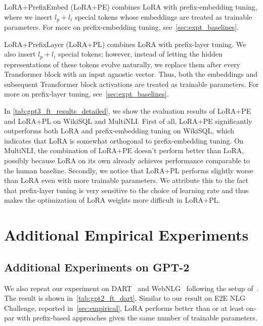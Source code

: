 \documentclass{article} %
\begin{document}
LoRA+PrefixEmbed (LoRA+PE) combines LoRA with prefix-embedding tuning, where we insert $l_p+l_i$ special tokens whose embeddings are treated as trainable parameters.
For more on prefix-embedding tuning, see~\autoref{sec:expt_baselines}.

LoRA+PrefixLayer (LoRA+PL) combines LoRA with prefix-layer tuning.
We also insert $l_p+l_i$ special tokens; however, instead of letting the hidden representations of these tokens evolve naturally, we replace them after every Transformer block with an input agnostic vector.
Thus, both the embeddings and subsequent Transformer block activations are treated as trainable parameters.
For more on prefix-layer tuning, see~\autoref{sec:expt_baselines}.

In \autoref{tab:gpt3_ft_results_detailed}, we show the evaluation results of LoRA+PE and LoRA+PL on WikiSQL and MultiNLI.
First of all, LoRA+PE significantly outperforms both LoRA and prefix-embedding tuning on WikiSQL, which indicates that LoRA is somewhat orthogonal to prefix-embedding tuning.
On MultiNLI, the combination of LoRA+PE doesn't perform better than LoRA, possibly because LoRA on its own  already achieves performance comparable to the human baseline.
Secondly, we notice that LoRA+PL performs slightly worse than LoRA even with more trainable parameters.
We attribute this to the fact that prefix-layer tuning is very sensitive to the choice of learning rate and thus makes the optimization of LoRA weights more difficult in LoRA+PL.

\section{Additional Empirical Experiments}
\label{app:extra_expt}

\subsection{Additional Experiments on GPT-2}
\label{app:gpt2_extra}

We also repeat our experiment on DART~\citep{nan2020dart} and WebNLG~\citep{gardent2017webnlg} following the setup of~\cite{li_prefix-tuning_2021}.
The result is shown in~\autoref{tab:gpt2_ft_dart}.
Similar to our result on E2E NLG Challenge, reported in~\autoref{sec:empirical}, LoRA performs better than or at least on-par with prefix-based approaches given the same number of trainable parameters.
\end{document}
